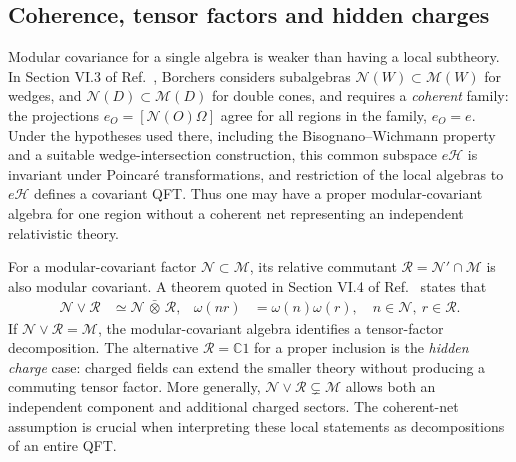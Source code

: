 \documentclass[a4paper,11pt]{article}
\theoremstyle{definition}
\begin{document}
\subsection{Coherence, tensor factors and hidden charges}
\label{subsec:qft-coherent-subtheories}
Modular covariance for a single algebra is weaker than having a local
subtheory. In Section VI.3 of Ref.~\cite{revolutionizing}, Borchers
considers subalgebras $\mathcal N(W)\subset\mathcal M(W)$ for wedges,
and $\mathcal N(D)\subset\mathcal M(D)$ for double cones, and requires a
\emph{coherent} family: the projections
$e_O=[\mathcal N(O)\Omega]$ agree for all regions in the family,
$e_O=e$. Under the hypotheses used there, including the
Bisognano--Wichmann property and a suitable wedge-intersection
construction, this common subspace $e\mathcal H$ is invariant under
Poincar\'e transformations, and restriction of the local algebras to
$e\mathcal H$ defines a covariant QFT. Thus one may have a proper
modular-covariant algebra for one region without a coherent net
representing an independent relativistic theory.

For a modular-covariant factor $\mathcal N\subset\mathcal M$, its
relative commutant $\mathcal R=\mathcal N'\cap\mathcal M$ is also
modular covariant. A theorem quoted in Section VI.4 of
Ref.~\cite{revolutionizing} states that
\begin{align}
 \mathcal N\vee\mathcal R&\simeq
      \mathcal N\,\bar\otimes\,\mathcal R,
 &\omega(nr)&=\omega(n)\omega(r),
 \quad n\in\mathcal N,\ r\in\mathcal R .
 \label{eq:qft-Borchers-product}
\end{align}
If $\mathcal N\vee\mathcal R=\mathcal M$, the modular-covariant algebra
identifies a tensor-factor decomposition. The alternative
$\mathcal R=\mathbb C1$ for a proper inclusion is the \emph{hidden charge}
case: charged fields can extend the smaller theory without producing a
commuting tensor factor. More generally,
$\mathcal N\vee\mathcal R\subsetneq\mathcal M$ allows both an independent
component and additional charged sectors. The coherent-net assumption
is crucial when interpreting these local statements as decompositions
of an entire QFT.
\end{document}
